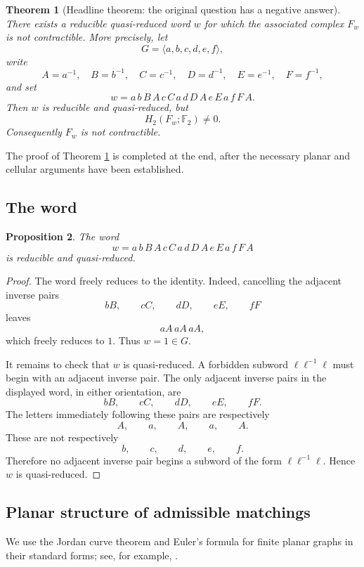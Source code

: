 \documentclass[12pt]{article}
\newcommand{\Ftwo}{\mathbb{F}_2}
\newtheorem{theorem}{Theorem}
\newtheorem{proposition}[theorem]{Proposition}
\theoremstyle{definition}
\begin{document}
\begin{theorem}[Headline theorem: the original question has a negative answer]\label{thm:headline}
There exists a reducible quasi-reduced word \(w\) for which the associated complex \(F_w\) is not contractible.  More precisely, let
\[
G=\langle a,b,c,d,e,f\rangle,
\]
write
\[
A=a^{-1},\quad B=b^{-1},\quad C=c^{-1},\quad
D=d^{-1},\quad E=e^{-1},\quad F=f^{-1},
\]
and set
\[
w=a\,b\,B\,A\,c\,C\,a\,d\,D\,A\,e\,E\,a\,f\,F\,A.
\]
Then \(w\) is reducible and quasi-reduced, but
\[
H_2(F_w;\Ftwo)\neq 0.
\]
Consequently \(F_w\) is not contractible.
\end{theorem}

The proof of Theorem \ref{thm:headline} is completed at the end, after the necessary planar and cellular arguments have been established.

\subsection{The word}

\begin{proposition}\label{prop:word}
The word
\[
w=a\,b\,B\,A\,c\,C\,a\,d\,D\,A\,e\,E\,a\,f\,F\,A
\]
is reducible and quasi-reduced.
\end{proposition}

\begin{proof}
The word freely reduces to the identity.  Indeed, cancelling the adjacent inverse pairs
\[
bB,\qquad cC,\qquad dD,\qquad eE,\qquad fF
\]
leaves
\[
aA\,aA\,aA,
\]
which freely reduces to \(1\).  Thus \(w=1\in G\).

It remains to check that \(w\) is quasi-reduced.  A forbidden subword \(\ell\ell^{-1}\ell\) must begin with an adjacent inverse pair.  The only adjacent inverse pairs in the displayed word, in either orientation, are
\[
bB,\qquad cC,\qquad dD,\qquad eE,\qquad fF.
\]
The letters immediately following these pairs are respectively
\[
A,\qquad a,\qquad A,\qquad a,\qquad A.
\]
These are not respectively
\[
b,\qquad c,\qquad d,\qquad e,\qquad f.
\]
Therefore no adjacent inverse pair begins a subword of the form \(\ell\ell^{-1}\ell\).  Hence \(w\) is quasi-reduced.
\end{proof}

\subsection{Planar structure of admissible matchings}

We use the Jordan curve theorem and Euler's formula for finite planar graphs in their standard forms; see, for example, \cite{Munkres}.
\end{document}

